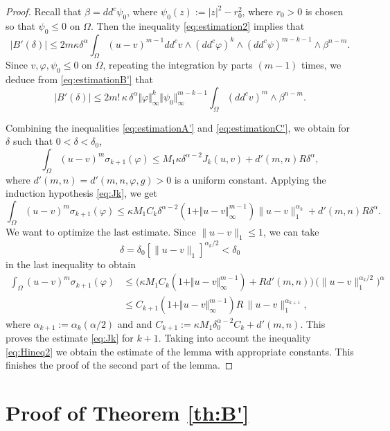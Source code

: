 \documentclass[11pt]{article}
\numberwithin{equation}{section}
\theoremstyle{definition}
\theoremstyle{plain}
\theoremstyle{definition}
\begin{document}
\begin{proof}
Recall that $\beta = dd^c \psi_0$, where $\psi_0 (z) := \vert z\vert^2 -r_0^2$, where $r_0 > 0$ is chosen so that $\psi_0 \leq 0$ on $\Omega$.
Then the inequality \eqref{eq:estimation2} implies that
\begin{equation} \label{eq:estimationB'}
|B' (\delta)| \leq 2 m \kappa \delta^{\alpha} \int_\Omega (u-v)^{m -1} dd^c v \wedge (dd^c\varphi)^k \wedge (dd^c \psi)^{m - k-1} \wedge\beta^{n-m}.
\end{equation}
Since $v, \varphi, \psi_0 \leq 0$ on $\Omega$, repeating the integration by parts $(m-1)$ times, we deduce from \eqref{eq:estimationB'} that
\begin{equation} \label{eq:estimationC'}
|B' (\delta)| \leq 2 m! \, \kappa \, \delta^{\alpha} \Vert \varphi\Vert_{\infty}^k \Vert \psi_0\Vert_{\infty}^{m - k-1} \int_\Omega (dd^c v)^m \wedge\beta^{n-m}.
\end{equation}

Combining the inequalities \eqref{eq:estimationA'} and \eqref{eq:estimationC'}, we obtain for $\delta$ such that $0 < \delta < \delta_0$,
\[
\int_{\Omega}(u-v)^m \sigma_{k +1}(\varphi)\leq M_1 \kappa \delta^{\alpha- 2} J_k (u,v)+ d'(m,n) R \delta^{\alpha},
\]
where $d'(m,n) = d'(m,n,\varphi,g) > 0$ is a uniform constant.
Applying the induction hypothesis \eqref{eq:Jk}, we get
\[
\int_{\Omega}(u-v)^m \sigma_{k +1}(\varphi)\leq \kappa M_1 C_k\delta^{\alpha- 2}  (1+\Vert u - v \Vert_{\infty}^{m -1}) \|u-v\|_1^{\alpha_k}+ d'(m,n) R \delta^{\alpha}.
\]
We want to optimize the last estimate. Since $ \|u-v\|_1 \leq 1$, we can take
\[
\delta= \delta_0 [\|u-v\|_1]^{\alpha_k\slash 2} < \delta_0
\]
in the last inequality to obtain
\begin{align*}
\int_{\Omega}(u-v)^m \sigma_{k+1}(\varphi) &\leq  \bigl(\kappa M_1 C_k (1+\Vert u - v\Vert_{\infty}^{m -1}) + R d'(m,n)\bigr)\, \bigl(\|u-v\|_1^{\alpha_k \slash 2}\bigr)^{\alpha } \\
& \leq  C_{k + 1} (1 + \Vert u - v\Vert_{\infty}^{m -1} ) R\, \|u-v\|_1^{\alpha_{k+ 1}},
\end{align*}
where $\alpha_{k + 1} := \alpha_k (\alpha \slash 2)$ and and $C_{k+1} := \kappa M_1 \delta_0^{\alpha-2}C_k + d'(m,n)$.
This proves the estimate \eqref{eq:Jk} for $k+1$. Taking into account the inequality \eqref{eq:Hineq2} we obtain the estimate of the lemma with appropriate constants. This finishes the proof of the second part of the lemma.
\end{proof}

\section{Proof of Theorem \ref{th:B'}}
\end{document}
